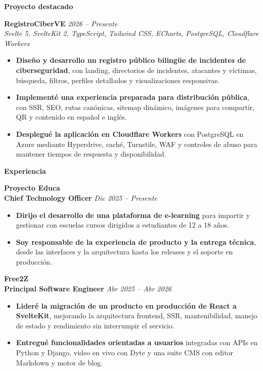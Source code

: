 \documentclass[11pt]{article}
\begin{document}
\vspace{8pt}
\begin{center}
    \textbf{Proyecto destacado}
\end{center}
\vspace{-4pt}
\textbf{RegistroCiberVE} \hfill \textit{2026 -- Presente} \\
\textit{Svelte 5, SvelteKit 2, TypeScript, Tailwind CSS, ECharts, PostgreSQL, Cloudflare Workers}
\begin{itemize}
    \item \textbf{Diseño y desarrollo un registro público bilingüe de incidentes de ciberseguridad}, con landing, directorios de incidentes, atacantes y víctimas, búsqueda, filtros, perfiles detallados y visualizaciones responsivas.
    \item \textbf{Implementé una experiencia preparada para distribución pública}, con SSR, SEO, rutas canónicas, sitemap dinámico, imágenes para compartir, QR y contenido en español e inglés.
    \item \textbf{Desplegué la aplicación en Cloudflare Workers} con PostgreSQL en Azure mediante Hyperdrive, caché, Turnstile, WAF y controles de abuso para mantener tiempos de respuesta y disponibilidad.
\end{itemize}

\vspace{8pt}
\begin{center}
    \textbf{Experiencia}
\end{center}
\vspace{-4pt}

\textbf{Proyecto Educa} \\
\textbf{Chief Technology Officer} \hfill \textit{Dic 2025 -- Presente}
\begin{itemize}
    \item \textbf{Dirijo el desarrollo de una plataforma de e-learning} para impartir y gestionar con escuelas cursos dirigidos a estudiantes de 12 a 18 años.
    \item \textbf{Soy responsable de la experiencia de producto y la entrega técnica}, desde las interfaces y la arquitectura hasta los releases y el soporte en producción.
\end{itemize}

\vspace{8pt}
\textbf{Free2Z} \\
\textbf{Principal Software Engineer} \hfill \textit{Abr 2025 -- Abr 2026}
\begin{itemize}
    \item \textbf{Lideré la migración de un producto en producción de React a SvelteKit}, mejorando la arquitectura frontend, SSR, mantenibilidad, manejo de estado y rendimiento sin interrumpir el servicio.
    \item \textbf{Entregué funcionalidades orientadas a usuarios} integradas con APIs en Python y Django, video en vivo con Dyte y una suite CMS con editor Markdown y motor de blog.
\end{itemize}
\end{document}
